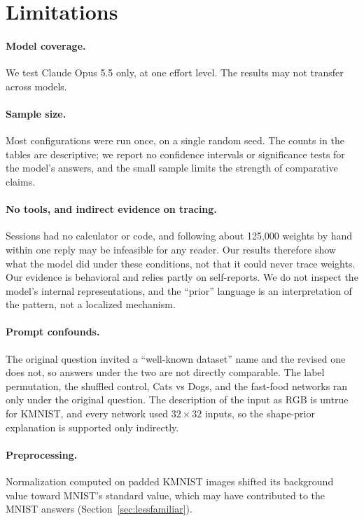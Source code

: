 \documentclass[11pt]{article}
\begin{document}
\section{Limitations}

\paragraph{Model coverage.} We test Claude Opus 5.5 only, at one effort level. The results may not transfer across models.

\paragraph{Sample size.} Most configurations were run once, on a single random seed. The counts in the tables are descriptive; we report no confidence intervals or significance tests for the model's answers, and the small sample limits the strength of comparative claims.

\paragraph{No tools, and indirect evidence on tracing.} Sessions had no calculator or code, and following about 125,000 weights by hand within one reply may be infeasible for any reader. Our results therefore show what the model did under these conditions, not that it could never trace weights. Our evidence is behavioral and relies partly on self-reports. We do not inspect the model's internal representations, and the ``prior'' language is an interpretation of the pattern, not a localized mechanism.

\paragraph{Prompt confounds.} The original question invited a ``well-known dataset'' name and the revised one does not, so answers under the two are not directly comparable. The label permutation, the shuffled control, Cats vs Dogs, and the fast-food networks ran only under the original question. The description of the input as RGB is untrue for KMNIST, and every network used $32\times32$ inputs, so the shape-prior explanation is supported only indirectly.

\paragraph{Preprocessing.} Normalization computed on padded KMNIST images shifted its background value toward MNIST's standard value, which may have contributed to the MNIST answers (Section~\ref{sec:lessfamiliar}).
\end{document}
